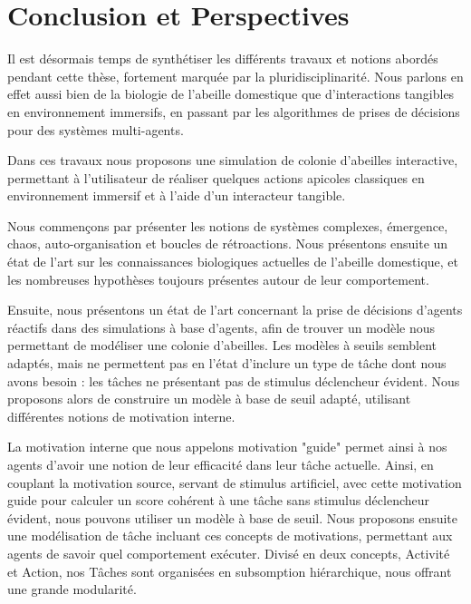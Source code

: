 \chapter*{Conclusion et Perspectives}

Il est désormais temps de synthétiser les différents travaux et notions abordés pendant cette thèse, fortement marquée par la pluridisciplinarité. Nous parlons en effet aussi bien de la biologie de l'abeille domestique que d'interactions tangibles en environnement immersifs, en passant par les algorithmes de prises de décisions pour des systèmes multi-agents.

Dans ces travaux nous proposons une simulation de colonie d'abeilles interactive, permettant à l'utilisateur de réaliser quelques actions apicoles classiques en environnement immersif et à l'aide d'un interacteur tangible.

Nous commençons par présenter les notions de systèmes complexes, émergence, chaos, auto-organisation et boucles de rétroactions. Nous présentons ensuite un état de l'art sur les connaissances biologiques actuelles de l'abeille domestique, et les nombreuses hypothèses toujours présentes autour de leur comportement.

Ensuite, nous présentons un état de l'art concernant la prise de décisions d'agents réactifs dans des simulations à base d'agents, afin de trouver un modèle nous permettant de modéliser une colonie d'abeilles. Les modèles à seuils semblent adaptés, mais ne permettent pas en l'état d'inclure un type de tâche dont nous avons besoin : les tâches ne présentant pas de stimulus déclencheur évident. Nous proposons alors de construire un modèle à base de seuil adapté, utilisant différentes notions de motivation interne.

La motivation interne que nous appelons motivation "guide" permet ainsi à nos agents d'avoir une notion de leur efficacité dans leur tâche actuelle. Ainsi, en couplant la motivation source, servant de stimulus artificiel, avec cette motivation guide pour calculer un score cohérent à une tâche sans stimulus déclencheur évident, nous pouvons utiliser un modèle à base de seuil. Nous proposons ensuite une modélisation de tâche incluant ces concepts de motivations, permettant aux agents de savoir quel comportement exécuter. Divisé en deux concepts, Activité et Action, nos Tâches sont organisées en subsomption hiérarchique, nous offrant une grande modularité.

